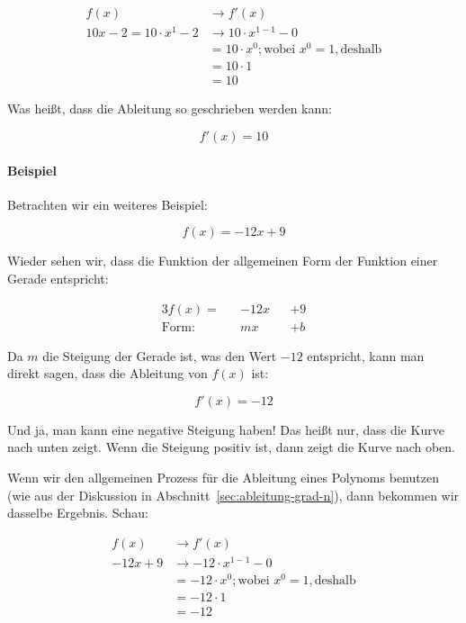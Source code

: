 \documentclass{scrartcl}
\begin{document}
\begin{align}
    f(x) &\rightarrow f'(x)\\
    10 x - 2 = 10 \cdot x^1 - 2 &\rightarrow 10 \cdot x^{1 - 1} - 0\\
    &= 10 \cdot x^0; \text{wobei } x^0 = 1, \text{deshalb}\\
    &= 10 \cdot 1\\
    &= 10
\end{align}

Was heißt, dass die Ableitung so geschrieben werden kann:

\begin{equation}
    f'(x) = 10
\end{equation}

\paragraph{Beispiel} Betrachten wir ein weiteres Beispiel:

\begin{equation}
    f(x) = -12 x + 9
\end{equation}

Wieder sehen wir, dass die Funktion der allgemeinen Form der Funktion einer
Gerade entspricht:

\begin{alignat}{3}
    f(x) = && -12 x &&+ 9\\
    \text{Form: } && m x &&+ b
\end{alignat}

Da $m$ die Steigung der Gerade ist, was den Wert $-12$ entspricht, kann man
direkt sagen, dass die Ableitung von $f(x)$ ist:

\begin{equation}
    f'(x) = -12
\end{equation}

Und ja, man kann eine negative Steigung haben!  Das heißt nur, dass die
Kurve nach unten zeigt.  Wenn die Steigung positiv ist, dann zeigt die Kurve
nach oben.

Wenn wir den allgemeinen Prozess für die Ableitung eines Polynoms benutzen
(wie aus der Diskussion in Abschnitt~\ref{sec:ableitung-grad-n}), dann
bekommen wir dasselbe Ergebnis.  Schau:

\begin{align}
    f(x) &\rightarrow f'(x)\\
    -12x + 9 &\rightarrow -12 \cdot x^{1 - 1} - 0\\
    &= -12 \cdot x^0; \text{wobei } x^0 = 1, \text{deshalb}\\
    &= -12 \cdot 1\\
    &= -12
\end{align}
\end{document}
